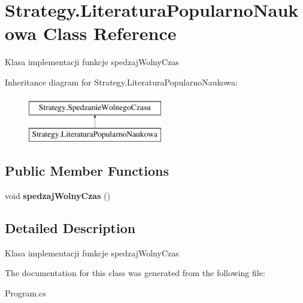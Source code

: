 \hypertarget{class_strategy_1_1_literatura_popularno_naukowa}{}\section{Strategy.\+Literatura\+Popularno\+Naukowa Class Reference}
\label{class_strategy_1_1_literatura_popularno_naukowa}


Klasa implementacji funkcje spedzaj\+Wolny\+Czas  


Inheritance diagram for Strategy.\+Literatura\+Popularno\+Naukowa\+:\begin{figure}[H]
\begin{center}
\leavevmode
\includegraphics[height=2.000000cm]{class_strategy_1_1_literatura_popularno_naukowa}
\end{center}
\end{figure}
\subsection*{Public Member Functions}
\begin{DoxyCompactItemize}
\item 
\mbox{\label{class_strategy_1_1_literatura_popularno_naukowa_a56682dade4c6965a18d3131116cbf495}} 
void {\bfseries spedzaj\+Wolny\+Czas} ()
\end{DoxyCompactItemize}


\subsection{Detailed Description}
Klasa implementacji funkcje spedzaj\+Wolny\+Czas 



The documentation for this class was generated from the following file\+:\begin{DoxyCompactItemize}
\item 
Program.\+cs\end{DoxyCompactItemize}
